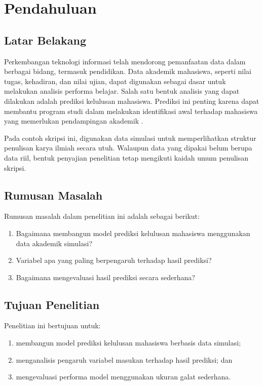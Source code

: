 \documentclass[skripsi]{unnes-ta_plus}
\begin{document}
\tableofcontents
\clearpage

\unnesMainMatter

\chapter{Pendahuluan}

\section{Latar Belakang}
Perkembangan teknologi informasi telah mendorong pemanfaatan data dalam berbagai bidang, termasuk pendidikan. Data akademik mahasiswa, seperti nilai tugas, kehadiran, dan nilai ujian, dapat digunakan sebagai dasar untuk melakukan analisis performa belajar. Salah satu bentuk analisis yang dapat dilakukan adalah prediksi kelulusan mahasiswa. Prediksi ini penting karena dapat membantu program studi dalam melakukan identifikasi awal terhadap mahasiswa yang memerlukan pendampingan akademik \cite{ahmad2022,pratama2023}.

Pada contoh skripsi ini, digunakan data simulasi untuk memperlihatkan struktur penulisan karya ilmiah secara utuh. Walaupun data yang dipakai belum berupa data riil, bentuk penyajian penelitian tetap mengikuti kaidah umum penulisan skripsi.

\section{Rumusan Masalah}
Rumusan masalah dalam penelitian ini adalah sebagai berikut:
\begin{enumerate}
    \item Bagaimana membangun model prediksi kelulusan mahasiswa menggunakan data akademik simulasi?
    \item Variabel apa yang paling berpengaruh terhadap hasil prediksi?
    \item Bagaimana mengevaluasi hasil prediksi secara sederhana?
\end{enumerate}

\section{Tujuan Penelitian}
Penelitian ini bertujuan untuk:
\begin{enumerate}
    \item membangun model prediksi kelulusan mahasiswa berbasis data simulasi;
    \item menganalisis pengaruh variabel masukan terhadap hasil prediksi; dan
    \item mengevaluasi performa model menggunakan ukuran galat sederhana.
\end{enumerate}
\end{document}
